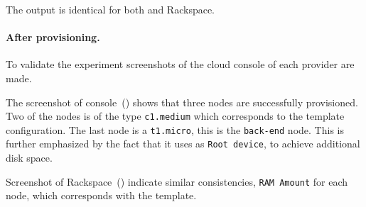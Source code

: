 The output is identical for both  and Rackspace.

\paragraph{After provisioning.}


To validate the experiment screenshots of the cloud console of each provider are made.

The screenshot of  console~() shows that three nodes
are successfully provisioned.
Two of the nodes is of the type \texttt{c1.medium} which corresponds to the template configuration.
The last node is a \texttt{t1.micro}, \ie this is the \texttt{back-end} node.
This is further emphasized by the fact that it uses  as \texttt{Root device},
to achieve additional disk space.

Screenshot of Rackspace~() indicate similar consistencies,
\eg \texttt{RAM Amount} for each node, which corresponds with the template.
